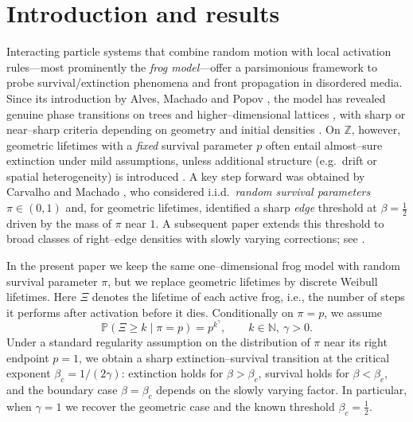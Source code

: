 \documentclass[preprint]{imsart}
\newcommand{\1}{\mathbf{1}}
\theoremstyle{plain}
\theoremstyle{definition}
\begin{document}




\section{Introduction and results}


Interacting particle systems that combine random motion with local activation rules—most prominently the \emph{frog model}—offer a parsimonious framework to probe survival/extinction phenomena and front propagation in disordered media. Since its introduction by Alves, Machado and Popov \cite{Alves2002}, the model has revealed genuine phase transitions on trees and higher–dimensional lattices \cite{Fontes2004,Lebensztayn2005,Gallo2023}, with sharp or near–sharp criteria depending on geometry and initial densities \cite{Lebensztayn2005,Lebensztayn2019,Lebensztayn2020}. On $\mathbb{Z}$, however, geometric lifetimes with a \emph{fixed} survival parameter $p$ often entail almost–sure extinction under mild assumptions, unless additional structure (e.g.\ drift or spatial heterogeneity) is introduced \cite{Bertacchi2014,Gantert2009}. A key step forward was obtained by Carvalho and Machado \cite{CarvalhoMachado2025}, who considered i.i.d.\ \emph{random survival parameters} $\pi\in(0,1)$ and, for geometric lifetimes, identified a sharp \emph{edge} threshold at $\beta=\tfrac12$ driven by the mass of $\pi$ near $1$. A subsequent paper extends this threshold to broad classes of right–edge densities with slowly varying corrections; see \cite{JGF}.

In the present paper we keep the same one--dimensional frog model with random survival parameter $\pi$, but we replace geometric lifetimes by discrete Weibull lifetimes. Here $\Xi$ denotes the lifetime of each active frog, i.e., the number of steps it performs after activation before it dies. Conditionally on $\pi=p$, we assume
\[
\mathbb{P}(\Xi \ge k \mid \pi=p)=p^{k^\gamma}, \qquad k\in\mathbb{N},\ \gamma>0.
\]
Under a standard regularity assumption on the distribution of $\pi$ near its right endpoint $p=1$, we obtain a sharp extinction--survival transition at the critical exponent $\beta_c=1/(2\gamma)$: extinction holds for $\beta>\beta_c$, survival holds for $\beta<\beta_c$, and the boundary case $\beta=\beta_c$ depends on the slowly varying factor. In particular, when $\gamma=1$ we recover the geometric case and the known threshold $\beta_c=\tfrac12$.
\end{document}

